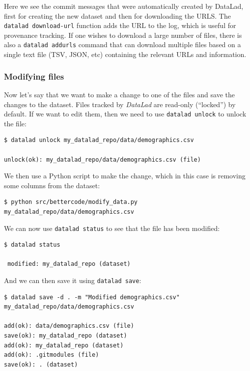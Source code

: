 Here we see the commit messages that were automatically created by DataLad, first for creating the new dataset and then for downloading the URLS.  The \texttt{datalad download-url} function adds the URL to the log, which is useful for provenance tracking. If one wishes to download a large number of files, there is also a \texttt{datalad addurls} command that can download multiple files based on a single text file (TSV, JSON, etc) containing the relevant URLs and information.

\subsubsection{Modifying files}

Now let's say that we want to make a change to one of the files and save the changes to the dataset.  Files tracked by \textit{DataLad} are read-only (``locked'') by default.  If we want to edit them, then we need to use \texttt{datalad unlock} to unlock the file:

\begin{lstlisting}[style=shellshort]
$ datalad unlock my_datalad_repo/data/demographics.csv

unlock(ok): my_datalad_repo/data/demographics.csv (file)
\end{lstlisting}

We then use a Python script to make the change, which in this case is removing some columns from the dataset:

\begin{lstlisting}[style=shellshort]
$ python src/bettercode/modify_data.py my_datalad_repo/data/demographics.csv
\end{lstlisting}

We can now use \texttt{datalad status} to see that the file has been modified:

\begin{lstlisting}[style=shellshort]
$ datalad status

 modified: my_datalad_repo (dataset)
\end{lstlisting}

And we can then save it using \texttt{datalad save}:

\begin{lstlisting}[style=shell]
$ datalad save -d . -m "Modified demographics.csv" my_datalad_repo/data/demographics.csv

add(ok): data/demographics.csv (file)
save(ok): my_datalad_repo (dataset)
add(ok): my_datalad_repo (dataset)
add(ok): .gitmodules (file)
save(ok): . (dataset)
\end{lstlisting}

